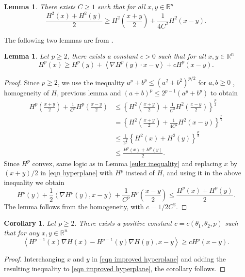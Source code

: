 \documentclass[11pt]{amsart}
\newtheorem{lemma}[theorem]{Lemma}
\newtheorem{corollary}[theorem]{Corollary}
\newcommand{\rn}{\mathbb{R}^{n}}
\newcommand{\fin}[1]{H^{p-1}( #1)\nabla H( #1)}
\numberwithin{equation}{section}
\begin{document}
\begin{lemma}
    There exists $C\geq 1$ such that for all $x,y\in\rn $ 
    \begin{equation*}
        \frac{H^{2}(x)+H^{2}(y)}{2}\geq H^{2}\left(\frac{x+y}{2}\right)+\frac{1}{4C^{2}}H^{2}(x-y).
    \end{equation*}
\end{lemma}
The following two lemmas are from \cite{BalGarainMukarjee2021}.
\begin{lemma}
    Let $p\geq 2$, there exists a constant $c>0$ such that for all $x,y\in\rn$
    \begin{equation}\label{eqn improved hyperplane}
        H^{p}(x)\geq H^{p}(y)+\left<\nabla H^{p}(y)\cdot x-y\right>+cH^{p}(x-y).
    \end{equation}
\end{lemma}
\begin{proof}
    Since $p\geq 2$, we use the inequality $a^{p}+b^{p}\leq (a^{2}+b^{2})^{p/2}$ for $a,b\geq 0$ , homogeneity of $H$, previous lemma and $(a+b)^{p}\leq 2^{p-1}(a^{p}+b^{p})$ to obtain
    \begin{equation*}
    \begin{split}
       H^{p}\left(\frac{x+y}{2}\right)+\frac{1}{C^{p}}H^{p}\left(\frac{x-y}{2}\right)&\leq \left\{H^{2}\left(\frac{x+y}{2}\right)+\frac{1}{C^{2}}H^{2}\left(\frac{x-y}{2}\right)\right\}^{\frac{p}{2}} \\
       &= \left\{H^{2}\left(\frac{x+y}{2}\right)+\frac{1}{4C^{2}}H^{2}\left(x-y\right)\right\}^{\frac{p}{2}}\\
       &\leq \frac{1}{2^{\frac{p}{2}}}\left\{H^{2}(x)+H^{2}(y)\right\}^{\frac{p}{2}}\\
       &\leq \frac{H^{p}(x)+H^{p}(y)}{2}.
    \end{split}
    \end{equation*}
    Since $H^{p}$ convex, same logic as in Lemma \ref{euler inequality} and replacing $x$ by $(x+y)/2$ in \eqref{eqn hyperplane} with $H^{p}$ instead of $H$, and using it in the above inequality we obtain 
    \begin{equation*}
        H^{p}(y)+\frac{1}{2}\left<\nabla H^{p}(y), x-y\right>+\frac{1}{C^{p}}H^{p}\left(\frac{x-y}{2}\right)\leq \frac{H^{p}(x)+H^{p}(y)}{2}.
    \end{equation*}
    The lemma follows from the homogeneity, with $c=1/2C^{2}$.
\end{proof}
\begin{corollary}\label{strict convexity of H}
    Let $p\geq 2$. There exists a positive constant $c=c(\theta_{1},\theta_{2},p)$ such that for any $x,y\in \rn$
    \begin{equation*}
          \left<\fin{x}-\fin{y}, x-y\right>\geq c H^{p}(x-y).
    \end{equation*}
    \end{corollary}
\begin{proof}
Interchanging $x$ and $y$ in \eqref{eqn improved hyperplane} and adding the resulting inequality to \eqref{eqn improved hyperplane}, the corollary follows.
\end{proof}
\end{document}
